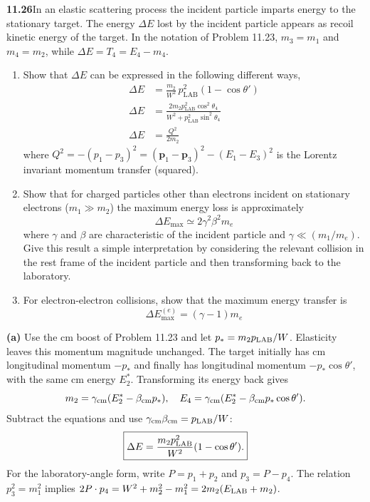 \par\bigskip
\noindent\textbf{11.26}\quad In an elastic scattering process the incident particle imparts energy to the stationary target. The energy $\Delta E$ lost by the incident particle appears as recoil kinetic energy of the target. In the notation of Problem 11.23, $m_{3}=m_{1}$ and $m_{4}=m_{2}$, while $\Delta E=T_{4}=E_{4}-m_{4}$.
\begin{enumerate}
\item[(a)] Show that $\Delta E$ can be expressed in the following different ways,
\begin{align*}
\Delta E&=\frac{m_{2}}{W^{2}}\,p_{\mathrm{LAB}}^{2}(1-\cos\theta')\\[4pt]
\Delta E&=\frac{2m_{2}p_{\mathrm{LAB}}^{2}\cos^{2}\theta_{4}}{W^{2}+p_{\mathrm{LAB}}^{2}\sin^{2}\theta_{4}}\\[4pt]
\Delta E&=\frac{Q^{2}}{2m_{2}}
\end{align*}
where $Q^{2}=-(p_{1}-p_{3})^{2}=(\mathbf{p}_{1}-\mathbf{p}_{3})^{2}-(E_{1}-E_{3})^{2}$ is the Lorentz invariant momentum transfer (squared).
\item[(b)] Show that for charged particles other than electrons incident on stationary electrons ($m_{1}\gg m_{2}$) the maximum energy loss is approximately
\[
\Delta E_{\max}\simeq2\gamma^{2}\beta^{2}m_{e}
\]
where $\gamma$ and $\beta$ are characteristic of the incident particle and $\gamma\ll(m_{1}/m_{e})$. Give this result a simple interpretation by considering the relevant collision in the rest frame of the incident particle and then transforming back to the laboratory.
\item[(c)] For electron-electron collisions, show that the maximum energy transfer is
\[
\Delta E_{\max}^{(e)}=(\gamma-1)m_{e}
\]
\end{enumerate}
\solution
\textbf{(a)} Use the cm boost of Problem 11.23 and let
$p_*=m_2p_{\rm LAB}/W$. Elasticity leaves this momentum magnitude
unchanged. The target initially has cm longitudinal momentum
$-p_*$ and finally has longitudinal momentum $-p_*\cos\theta'$,
with the same cm energy $E_2^*$. Transforming its energy back gives
\[
m_2=\gamma_{\rm cm}(E_2^*-\beta_{\rm cm}p_*),\quad
E_4=\gamma_{\rm cm}(E_2^*-\beta_{\rm cm}p_*\cos\theta').
\]
Subtract the equations and use
$\gamma_{\rm cm}\beta_{\rm cm}=p_{\rm LAB}/W$:
\[
\boxed{\Delta E=\frac{m_2p_{\rm LAB}^2}{W^2}(1-\cos\theta').}
\]
For the laboratory-angle form, write $P=p_1+p_2$ and
$p_3=P-p_4$. The relation $p_3^2=m_1^2$ implies
$2P\cdot p_4=W^2+m_2^2-m_1^2=2m_2(E_{\rm LAB}+m_2)$.
